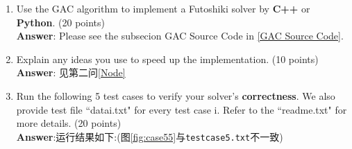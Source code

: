 \documentclass{article}
\begin{document}
\begin{enumerate}
\item Use the GAC algorithm to implement a Futoshiki solver by \textbf{C++} or \textbf{Python}. (20 points)\\
    \textbf{Answer}: Please see the subsecion GAC Source Code in \ref{GAC Source Code}.

\item Explain any ideas you use to speed up the implementation. (10 points)\\
\textbf{Answer}: 见第二问\ref{Node}

\item Run the following 5 test cases to verify your solver's \textbf{correctness}. We also provide test file ``datai.txt" for every test case i. Refer to the ``readme.txt" for more details. (20 points)\\
\textbf{Answer}:运行结果如下:(图\ref{fig:case55}与\texttt{testcase5.txt}不一致)\\
\newpage
\begin{figure}[!h]
    \centering
    \quad


\end{figure}
\end{enumerate}
\end{document}
